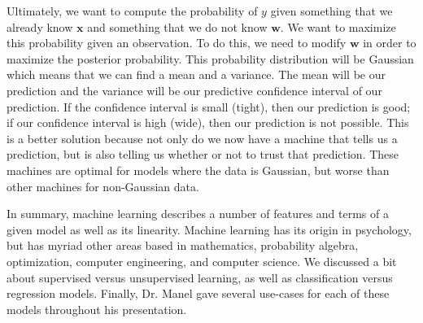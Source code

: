 \documentclass[11pt]{article}
\begin{document}
Ultimately, we want to compute the probability of \(y\) given something that we already know \(\mathbf{x}\) and something that we do not know \(\mathbf{w}\). We want to maximize this probability given an observation. To do this, we need to modify \(\mathbf{w}\) in order to maximize the posterior probability. This probability distribution will be Gaussian which means that we can find a mean and a variance. The mean will be our prediction and the variance will be our predictive confidence interval of our prediction. If the confidence interval is small (tight), then our prediction is good; if our confidence interval is high (wide), then our prediction is not possible. This is a better solution because not only do we now have a machine that tells us a prediction, but is also telling us whether or not to trust that prediction. These machines are optimal for models where the data is Gaussian, but worse than other machines for non-Gaussian data.

In summary, machine learning describes a number of features and terms of a given model as well as its linearity. Machine learning has its origin in psychology, but has myriad other areas based in mathematics, probability algebra, optimization, computer engineering, and computer science. We discussed a bit about supervised versus unsupervised learning, as well as classification versus regression models. Finally, Dr. Manel gave several use-cases for each of these models throughout his presentation.





\end{document}
